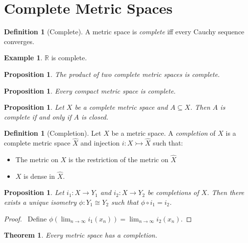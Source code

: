 \documentclass{book}
\let\qed\relax
\newtheorem{prop}[ax]{Proposition}
\newtheorem{thm}[ax]{Theorem}
\theoremstyle{definition}
\newtheorem{df}[ax]{Definition}
\newtheorem{ex}[ax]{Example}
\begin{document}
\section{Complete Metric Spaces}

\begin{df}[Complete]
A metric space is \emph{complete} iff every Cauchy sequence converges.
\end{df}

\begin{ex}
$\mathbb{R}$ is complete.
\end{ex}

\begin{prop}
The product of two complete metric spaces is complete.
\end{prop}

\begin{prop}
Every compact metric space is complete.
\end{prop}

\begin{prop}
Let $X$ be a complete metric space and $A \subseteq X$. Then $A$ is complete if and only if $A$ is closed.
\end{prop}

\begin{df}[Completion]
Let $X$ be a metric space. A \emph{completion} of $X$ is a complete metric space $\hat{X}$ and injection $i : X \rightarrowtail \hat{X}$ such that:
\begin{itemize}
\item The metric on $X$ is the restriction of the metric on $\hat{X}$
\item $X$ is dense in $\hat{X}$.
\end{itemize}
\end{df}

\begin{prop}
Let $i_1 : X \rightarrow Y_1$ and $i_2 : X \rightarrow Y_2$ be completions of $X$. Then there exists a unique isometry $\phi : Y_1 \cong Y_2$ such that $\phi \circ i_1 = i_2$.
\end{prop}

\begin{proof}
\pf\ Define $\phi(\lim_{n \rightarrow \infty} i_1(x_n)) = \lim_{n \rightarrow \infty} i_2(x_n)$. \qed
\end{proof}

\begin{thm}
Every metric space has a completion.
\end{thm}
\end{document}
